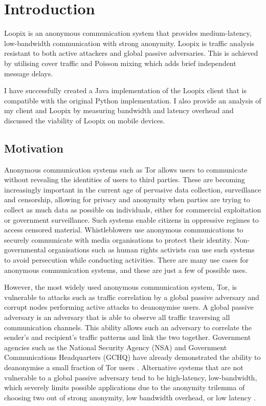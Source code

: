 \documentclass[final,dissertation.tex]{subfiles}
\begin{document}
\chapter{Introduction}

Loopix \cite{piotrowska2017loopix} is an anonymous communication system that provides medium-latency, low-bandwidth communication with strong anonymity. Loopix is traffic analysis resistant to both active attackers and global passive adversaries. This is achieved by utilising cover traffic and Poisson mixing which adds brief independent message delays.

I have successfully created a Java implementation of the Loopix client that is compatible with the original Python implementation. I also provide an analysis of my client and Loopix by measuring bandwidth and latency overhead and discussed the viability of Loopix on mobile devices.

\section{Motivation}


Anonymous communication systems such as Tor \cite{dingledine2004tor} allows users to communicate without revealing the identities of users to third parties. These are becoming increasingly important in the current age of pervasive data collection, surveillance and censorship, allowing for privacy and anonymity when parties are trying to collect as much data as possible on individuals, either for commercial exploitation or government surveillance. Such systems enable citizens in oppressive regimes to access censored material. Whistleblowers use anonymous communications to securely communicate with media organisations to protect their identity. Non-governmental organisations such as human rights activists can use such systems to avoid persecution while conducting activities. There are many use cases for anonymous communication systems, and these are just a few of possible uses.

However, the most widely used anonymous communication system, Tor, is vulnerable to attacks such as traffic correlation by a global passive adversary and corrupt nodes performing active attacks to deanonymise users. A global passive adversary is an adversary that is able to observe all traffic traversing all communication channels. This ability allows such an adversary to correlate the sender's and recipient's traffic patterns and link the two together. Government agencies such as the National Security Agency (NSA) and Government Communications Headquarters (GCHQ) have already demonstrated the ability to deanonymise a small fraction of Tor users \cite{torstinks}. Alternative systems that are not vulnerable to a global passive adversary tend to be high-latency, low-bandwidth, which severely limits possible applications due to the anonymity trilemma of choosing two out of strong anonymity, low bandwidth overhead, or low latency \cite{das2017anonymity}.
\end{document}
